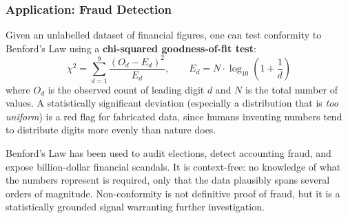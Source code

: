 \subsubsection*{Application: Fraud Detection}

\begin{example}
Given an unlabelled dataset of financial figures, one can test conformity to Benford's Law using a \textbf{chi-squared goodness-of-fit test}:
\[
\chi^2 = \sum_{d=1}^{9} \frac{(O_d - E_d)^2}{E_d}, \qquad E_d = N \cdot \log_{10}\!\left(1+\frac{1}{d}\right)
\]
where $O_d$ is the observed count of leading digit $d$ and $N$ is the total number of values. A statistically significant deviation (especially a distribution that is \emph{too uniform}) is a red flag for fabricated data, since humans inventing numbers tend to distribute digits more evenly than nature does.
\end{example}

\begin{remark}
Benford's Law has been used to audit elections, detect accounting fraud, and expose billion-dollar financial scandals. It is context-free: no knowledge of what the numbers represent is required, only that the data plausibly spans several orders of magnitude. Non-conformity is not definitive proof of fraud, but it is a statistically grounded signal warranting further investigation.
\end{remark}
